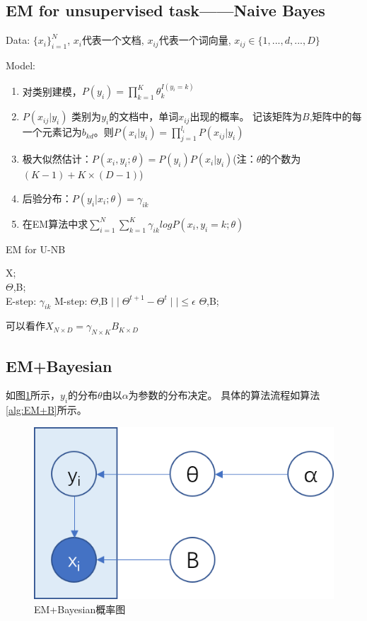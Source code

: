 \documentclass[UTF8]{ctexart}
\begin{document}
\subsection{ EM for unsupervised task——Naive Bayes}
Data: $\{x_i\}_{i=1}^N$, $x_i$代表一个文档, $x_{ij}$代表一个词向量,
$x_{ij}\in\{1,...,d,...,D\}$

Model: 
\begin{enumerate}
    \item 对类别建模，$P(y_i)=\prod_{k=1}^K\theta_k ^{I(y_i=k)}$
    \item $P(x_{ij}|y_i)$ 类别为$y_i$的文档中，单词$x_{ij}$出现的概率。
    记该矩阵为$B$,矩阵中的每一个元素记为$b_{kd}$。则$P(x_{i}|y_i)=\prod_{j=1}^{l_i}P(x_{ij}|y_i)$
    \item 极大似然估计：$P(x_i,y_i;\theta)=P(y_i)P(x_i|y_i)$(注：$\theta$的个数为$(K-1)+K\times(D-1)$)
    \item 后验分布：$P(y_i|x_i;\theta)=\gamma _{ik}$
    \item 在EM算法中求$\sum_{i=1}^N\sum_{k=1}^K\gamma_{ik}log P(x_i,y_i=k;\theta)$
\end{enumerate}
\begin{algorithm}[htb]
    \caption{EM for U-NB}
    \label{alg:EM-U-NB}
    \begin{algorithmic}[1]
    \REQUIRE
    X; \\
    \ENSURE 
    $\Theta$,B; \\
    \REPEAT 
    \STATE E-step: $\gamma_{ik}$
    \STATE M-step: $\Theta$,B
    \UNTIL $\mid\mid \Theta^{t+1} -\Theta^t \mid\mid \leq \epsilon$
    \RETURN $\Theta$,B;
    \end{algorithmic}
\end{algorithm}

可以看作$X_{N\times D}=\gamma_{N\times K}B_{K\times D}$

\subsection{EM+Bayesian}
如图\ref{fig:bay}所示，$y_i$的分布$\theta$由以$\alpha$为参数的分布决定。
具体的算法流程如算法\ref{alg:EM+B}所示。
\begin{figure}
    \centering
    \includegraphics{./figure/bayesian.png}
    \caption{EM+Bayesian概率图
    \label{fig:bay}}
\end{figure}
\end{document}
